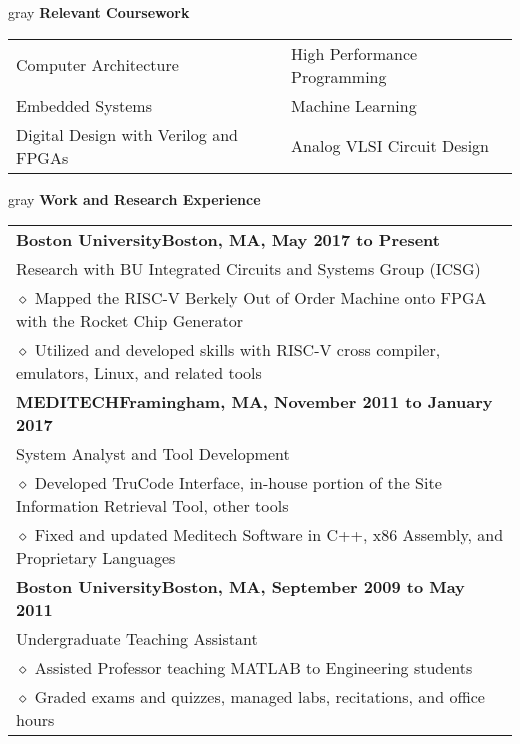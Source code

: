 \documentclass[10.5pt,letterpaper]{article}
\newcommand{\org}[1]{\textbf{#1}}
\newcommand{\pseudoitem}{\diamond}
\newcommand{\vertspace}{\vspace{1.2mm}}
\newcommand{\horzindent}{\hspace{3mm}}
\newcommand{\minorindent}{\hspace{4.5mm}}
\newcommand{\minoritem}{\minorindent $\pseudoitem$ }
\newcommand{\tablewidth}{.9\linewidth}
\newcommand{\undergrad}{Boston University}
\newcommand{\grad}{Boston University}
\begin{document}
	\vertspace
	\noindent	
	\begin{heading}{gray}
		\textbf{Relevant Coursework}
	\end{heading}
		\begin{tabular*}{\tablewidth}{@{\extracolsep{\fill}}ll}
			Computer Architecture & High Performance Programming \\
			Embedded Systems      & Machine Learning \\
			Digital Design with Verilog and FPGAs & Analog VLSI Circuit Design \\
		\end{tabular*}
		
	\fi
			
	\vertspace
	\noindent
	\begin{heading}{gray}
		\textbf{Work and Research Experience} 
	\end{heading}
		\begin{tabular*}{\tablewidth}{@{\extracolsep{\fill}}l}
			\org{\grad}\hfill \textbf{Boston, MA, May 2017 to Present}\\
			\horzindent Research with BU Integrated Circuits and Systems Group (ICSG)\\
			\minoritem Mapped the RISC-V Berkely Out of Order Machine onto FPGA with the Rocket Chip Generator\\
			\minoritem Utilized and developed skills with RISC-V cross compiler, emulators, Linux, and related tools\\
			\org{MEDITECH}\hfill \textbf{Framingham, MA, November 2011 to January 2017}\\
			\horzindent System Analyst and Tool Development \\
			\minoritem Developed TruCode Interface, in-house portion of the Site Information Retrieval Tool, other tools \\
			\minoritem Fixed and updated Meditech Software in C++, x86 Assembly, and Proprietary Languages \\
			\org{\undergrad}\hfill \textbf{Boston, MA, September 2009 to May 2011}\\
			\horzindent Undergraduate Teaching Assistant \\
			\minoritem Assisted Professor teaching MATLAB to Engineering students \\
			\minoritem Graded exams and quizzes, managed labs, recitations, and office hours \\
		\end{tabular*}
	
\end{document}

